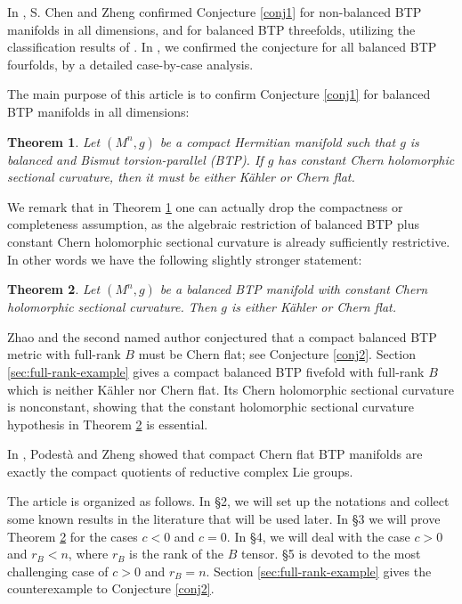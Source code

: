 \documentclass{amsart}
\newtheorem{theorem}{Theorem}%
\begin{document}
In \cite[Theorem 1.2]{ChenZ26}, S. Chen and Zheng confirmed Conjecture \ref{conj1} for non-balanced BTP manifolds in all dimensions, and for balanced BTP threefolds, utilizing the classification results of \cite{ZhaoZ25}. In \cite{WZ}, we confirmed the conjecture for all balanced BTP fourfolds, by a detailed case-by-case analysis.


The main purpose of this article is to confirm Conjecture \ref{conj1} for balanced BTP manifolds in all dimensions:

\begin{theorem} \label{thm1}
Let $(M^n,g)$ be a compact Hermitian manifold such that $g$ is balanced and Bismut torsion-parallel (BTP). If $g$ has constant Chern holomorphic sectional curvature, then it must be either K\"ahler or Chern flat.
\end{theorem}

We remark that in Theorem \ref{thm1} one can actually drop the compactness or completeness assumption, as the algebraic restriction of balanced BTP plus constant Chern holomorphic sectional curvature is already sufficiently restrictive. In other words we have the following slightly stronger statement:

\begin{theorem} \label{thm2}
Let $(M^n,g)$ be a  balanced BTP manifold with constant Chern holomorphic sectional curvature.  Then $g$ is either K\"ahler or Chern flat.
\end{theorem}

 Zhao and the second named author conjectured that a compact balanced
BTP metric with full-rank $B$ must be Chern flat; see Conjecture
\ref{conj2}. Section \ref{sec:full-rank-example} gives a compact balanced BTP
fivefold with full-rank $B$
which is neither K\"ahler nor Chern flat. Its Chern holomorphic sectional
curvature is nonconstant, showing that the constant holomorphic sectional
curvature hypothesis in Theorem \ref{thm2} is essential.


 In \cite{PodestaZ}, Podest\`a and Zheng showed that compact Chern flat BTP manifolds are exactly the compact quotients of reductive complex Lie groups.

The article is organized as follows. In \S 2, we will set up the notations and collect some known results in the literature that will be used later.  In \S 3 we will prove Theorem \ref{thm2} for the cases $c<0$ and $c=0$. In \S 4, we will deal with the case $c>0$ and $r_B<n$, where $r_B$ is the rank of the $B$ tensor.  \S 5 is devoted to the most challenging case of $c>0$ and $r_B=n$.   Section \ref{sec:full-rank-example} gives the counterexample to Conjecture \ref{conj2}.
\end{document}
